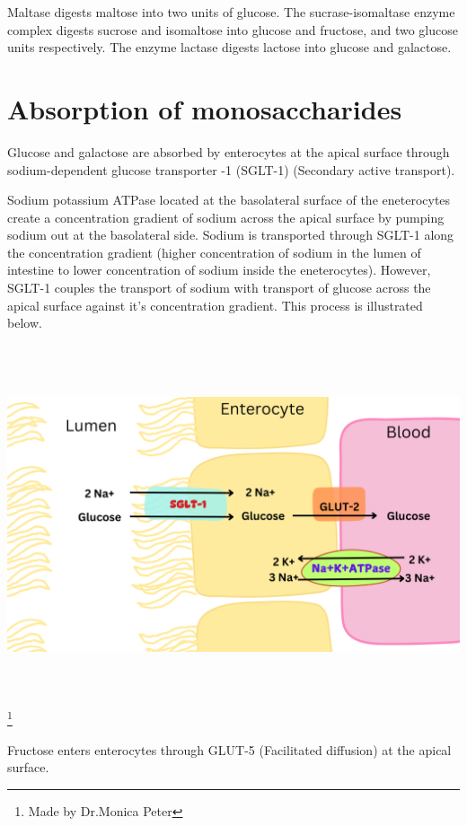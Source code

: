 \documentclass[
]{book}
\begin{document}
Maltase digests maltose into two units of glucose. The sucrase-isomaltase enzyme complex digests sucrose and isomaltose into glucose and fructose, and two glucose units respectively. The enzyme lactase digests lactose into glucose and galactose.

\section{Absorption of monosaccharides}\label{absorption-of-monosaccharides}

Glucose and galactose are absorbed by enterocytes at the apical surface through sodium-dependent glucose transporter -1 (SGLT-1) (Secondary active transport).

Sodium potassium ATPase located at the basolateral surface of the eneterocytes create a concentration gradient of sodium across the apical surface by pumping sodium out at the basolateral side. Sodium is transported through SGLT-1 along the concentration gradient (higher concentration of sodium in the lumen of intestine to lower concentration of sodium inside the eneterocytes). However, SGLT-1 couples the transport of sodium with transport of glucose across the apical surface against it's concentration gradient. This process is illustrated below.

\includegraphics[width=\textwidth,height=4.16667in]{Images/SGLT1.png}
\footnote{Made by Dr.Monica Peter}

Fructose enters enterocytes through GLUT-5 (Facilitated diffusion) at the apical surface.
\end{document}
